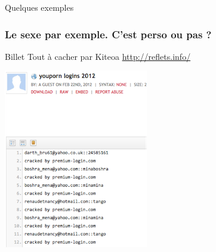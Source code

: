 \documentclass{beamer}
\begin{document}
\begin{frame}
\Huge{\centerline{Quelques exemples}}
\end{frame}

\begin{frame}
\frametitle{Le sexe par exemple. C’est perso ou pas ?}

\begin{block}{Billet Tout à cacher par Kiteoa \url{http://reflets.info/}}
\begin{itemize}
\end{itemize}
\end{block}
\begin{center}
\includegraphics[scale=1]{./images/youporn.png}
\end{center}
\end{frame}
\end{document}
